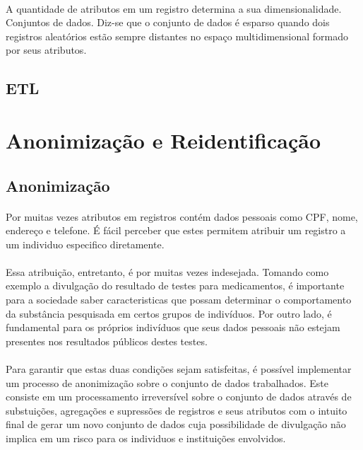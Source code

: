 \paragraph{} A quantidade de atributos em um registro determina a sua dimensionalidade. Conjuntos de dados. Diz-se que o conjunto de dados é esparso quando dois registros aleatórios estão sempre distantes no espaço multidimensional formado por seus atributos.

\subsection{ETL}

\section{Anonimização e Reidentificação}

\subsection{Anonimização}

\paragraph{} Por muitas vezes atributos em registros contém dados pessoais como CPF, nome, endereço e telefone. É fácil perceber que estes permitem atribuir um registro a um individuo especifico diretamente.

\paragraph{} Essa atribuição, entretanto, é por muitas vezes indesejada. Tomando como exemplo a divulgação do resultado de testes para medicamentos, é importante para a sociedade saber caracteristicas que possam determinar o comportamento da 
substância pesquisada em certos grupos de indivíduos. Por outro lado, é fundamental para os próprios indivíduos que seus dados pessoais não estejam presentes nos resultados públicos destes testes. 

\paragraph{} Para garantir que estas duas condições sejam satisfeitas, é possível implementar um processo de anonimização sobre o conjunto de dados trabalhados. Este consiste em um processamento irreversível\cite{dias2016multilingual} sobre o conjunto de dados através de substuições, agregações e supressões de registros e seus atributos com o intuito final de gerar um novo conjunto de dados cuja possibilidade de divulgação não implica em um risco para os individuos e instituições envolvidos. 

